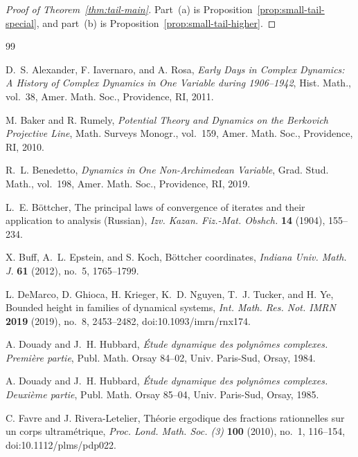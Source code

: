 \documentclass[11pt]{amsart}
\numberwithin{equation}{section}
\begin{document}
\begin{proof}[Proof of Theorem~\ref{thm:tail-main}]
Part~\textup{(a)} is Proposition~\ref{prop:small-tail-special}, and part~\textup{(b)} is Proposition~\ref{prop:small-tail-higher}.
\end{proof}

\begin{thebibliography}{99}

D.~S. Alexander, F. Iavernaro, and A. Rosa,
\emph{Early Days in Complex Dynamics: A History of Complex Dynamics in One Variable during 1906--1942},
Hist. Math., vol.~38, Amer. Math. Soc., Providence, RI, 2011.

M. Baker and R. Rumely,
\emph{Potential Theory and Dynamics on the Berkovich Projective Line},
Math. Surveys Monogr., vol.~159, Amer. Math. Soc., Providence, RI, 2010.

R.~L. Benedetto,
\emph{Dynamics in One Non-Archimedean Variable},
Grad. Stud. Math., vol.~198, Amer. Math. Soc., Providence, RI, 2019.

L.~E. B{\"o}ttcher,
The principal laws of convergence of iterates and their application to analysis (Russian),
\emph{Izv. Kazan. Fiz.-Mat. Obshch.} \textbf{14} (1904), 155--234.

X. Buff, A.~L. Epstein, and S. Koch,
B\"ottcher coordinates,
\emph{Indiana Univ. Math. J.} \textbf{61} (2012), no.~5, 1765--1799.



L. DeMarco, D. Ghioca, H. Krieger, K.~D. Nguyen, T.~J. Tucker, and H. Ye,
Bounded height in families of dynamical systems,
\emph{Int. Math. Res. Not. IMRN} \textbf{2019} (2019), no.~8, 2453--2482, doi:10.1093/imrn/rnx174.

A. Douady and J.~H. Hubbard,
\emph{\'{E}tude dynamique des polyn\^omes complexes. Premi\`ere partie},
Publ. Math. Orsay 84--02, Univ. Paris-Sud, Orsay, 1984.

A. Douady and J.~H. Hubbard,
\emph{\'{E}tude dynamique des polyn\^omes complexes. Deuxi\`eme partie},
Publ. Math. Orsay 85--04, Univ. Paris-Sud, Orsay, 1985.

C. Favre and J. Rivera-Letelier,
Th\'eorie ergodique des fractions rationnelles sur un corps ultram\'etrique,
\emph{Proc. Lond. Math. Soc. (3)} \textbf{100} (2010), no.~1, 116--154, doi:10.1112/plms/pdp022.





\end{thebibliography}
\end{document}

